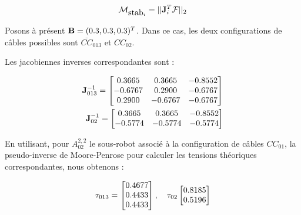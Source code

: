\begin{equation}
\mathcal M_{\hbox{stab}_i} = ||{\bf J}^T_i {\boldmath {\mathcal F}}||_2
\label{chap01:eq07}
\end{equation}

Posons à présent ${\bf B} = (0.3,0.3,0.3)^T$. Dans ce cas, les deux 
configurations de câbles possibles sont $\overline{CC}_{013}$ et $CC_{02}$.

Les jacobiennes inverses correspondantes sont :

\begin{equation}
\begin{split}
{\bf J}^{-1}_{013} = 
\begin{bmatrix}
0.3665 & 0.3665 & -0.8552 \\  
-0.6767 & 0.2900 & -0.6767 \\  
0.2900 & -0.6767 & -0.6767
\end{bmatrix} \\
{\bf J}^{-1}_{02} = 
\begin{bmatrix}
0.3665 & 0.3665 & -0.8552 \\  
-0.5774 & -0.5774 & -0.5774
\end{bmatrix}
\end{split}
\label{chap01:eq08}
\end{equation}

En utilisant, pour $A^{2,2}_{02}$ le sous-robot associé à la configuration de 
câbles $CC_{01}$, la pseudo-inverse de Moore-Penrose pour calculer les tensions 
théoriques correspondantes, nous obtenons :

\begin{equation}
{\bf \tau}_{013} = 
\begin{bmatrix}
0.4677 \\
0.4433 \\
0.4433
\end{bmatrix},
\quad
{\bf \tau}_{02}
\begin{bmatrix}
0.8185 \\ 
0.5196 
\end{bmatrix}
\label{chap01:eq09}
\end{equation}

